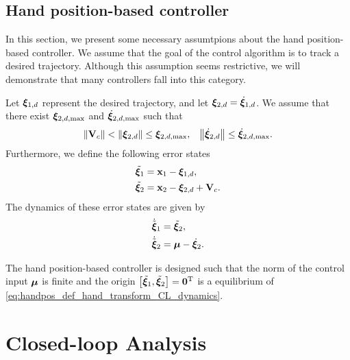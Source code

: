 \subsection{Hand position-based controller}
In this section, we present some necessary assumtpions about the hand position-based controller.
We assume that the goal of the control algorithm is to track a desired trajectory.
Although this assumption seems restrictive, we will demonstrate that many controllers fall into this category.

Let $\bm{\xi}_{1, d}$ represent the desired trajectory, and let $\bm{\xi}_{2, d} = \dot{\bm{\xi}}_{1, d}$.
We assume that there exist $\bm{\xi}_{2, d, \max}$ and $\dot{\bm{\xi}}_{2, d, \max}$ such that
\begin{align}
    \left\|\mathbf{V}_c\right\| &< \left\|\bm{\xi}_{2, d}\right\| \leq \bm{\xi}_{2, d, \max}, &
    \left\|\dot{\bm{\xi}}_{2, d}\right\| \leq \dot{\bm{\xi}}_{2, d, \max}.
\end{align}
Furthermore, we define the following error states
\begin{subequations}
    \begin{align}
        \tilde{\bm{\xi}}_1 &= \mathbf{x}_1 - \bm{\xi}_{1, d}, \\
        \tilde{\bm{\xi}}_2 &= \mathbf{x}_2 - \bm{\xi}_{2, d} + \mathbf{V}_c.
    \end{align} \label{eq:handpos_def_hand_transform_CL}
\end{subequations}
The dynamics of these error states are given by
\begin{subequations}
    \begin{align}
        \dot{\tilde{\bm{\xi}}}_1 &= \tilde{\bm{\xi}}_2, \\
        \dot{\tilde{\bm{\xi}}}_2 &= \bm{\mu} - \dot{\bm{\xi}}_2.
    \end{align} \label{eq:handpos_def_hand_transform_CL_dynamics}
\end{subequations}

\begin{asm}
    The hand position-based controller is designed such that the norm of the control input $\bm{\mu}$ is finite and the origin $\left[\tilde{\bm{\xi}}_1, \tilde{\bm{\xi}}_2\right] = \mathbf{0}^{\mathrm{T}}$ is a  equilibrium of \eqref{eq:handpos_def_hand_transform_CL_dynamics}.
\end{asm}

\section{Closed-loop Analysis}
\label{sec:handpos_def_closed_loop_analysis}

